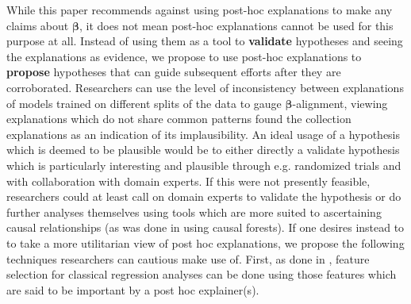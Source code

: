 \documentclass[mnsc,blindrev]{informs3}
\begin{document}
    While this paper  recommends against using post-hoc explanations to make any claims about $\boldsymbol{\beta}$, it does not mean post-hoc explanations cannot be used for this purpose at all. Instead of using them as a tool to \textbf{validate} hypotheses and seeing the explanations as evidence, we propose to use post-hoc explanations to \textbf{propose} hypotheses that can guide subsequent efforts after they are corroborated. Researchers can use the level of inconsistency between explanations of models trained on different splits of the data to gauge $\boldsymbol{\beta}$-alignment, viewing explanations which do not share common patterns found the collection explanations as an indication of its implausibility. An ideal usage of a hypothesis which is deemed to be plausible would be to either directly a validate hypothesis which is particularly interesting and plausible through e.g. randomized trials and with collaboration with domain experts. If this were not presently feasible, researchers could at least call on domain experts to validate the hypothesis \citep{donnelly2023rashomon} or do further analyses themselves using tools which are more suited to ascertaining causal relationships (as was done in \citep{zhang2023can} using causal forests). If one desires instead to to take a more utilitarian view of post hoc explanations, we propose the following techniques researchers can cautious make use of. First, as done in \cite{tang2024china}, feature selection for classical regression analyses can be done using those features which are said to be important by a post hoc explainer(s). 
    
    
    
 
\end{document}
